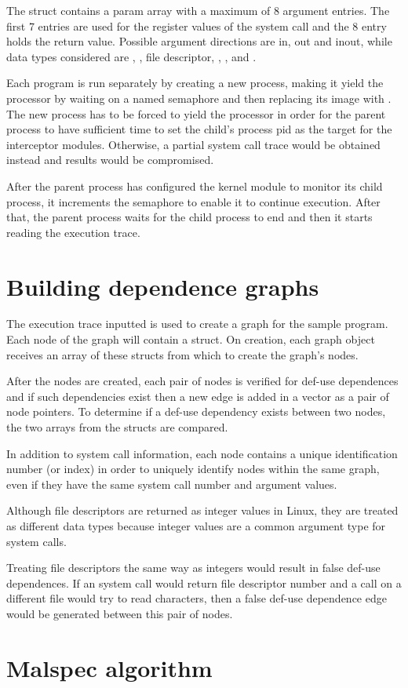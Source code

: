 The  struct contains a param array with a maximum of 8 argument entries. The first 7 entries are used for the register values of the system call and the 8 entry holds the return value.
Possible argument directions are  in, out and inout, while data types considered are , , file descriptor, , ,  and .

Each program is run separately by creating a new process, making it yield the processor by waiting on a named semaphore and then replacing its image with . The new process has to be forced to yield the processor in order for the parent process to have sufficient time to set the child’s process pid as the target for the interceptor modules. Otherwise, a partial system call trace would be obtained instead and results would be compromised. 

After the parent process has configured the kernel module to monitor its child process, it increments the semaphore to enable it to continue execution. After that, the parent process waits for the child process to end and then it starts reading the execution trace.

\section{Building dependence graphs}
\label{fourth:design}

The execution trace inputted is used to create a graph for the sample program. Each node of the graph will contain a  struct. On creation, each graph object receives an array of these structs from which to create the graph’s nodes.

After the nodes are created, each pair of nodes is verified for def-use dependences and if such dependencies exist then a new edge is added in a vector as a pair of node pointers. To determine if a def-use dependency exists between two nodes, the two  arrays from the  structs are compared.

In addition to system call information, each node contains a unique identification number (or index) in order to uniquely identify nodes within the same graph, even if they have the same system call number and argument values.

Although file descriptors are returned as integer values in Linux, they are treated as different data types because integer values are a common argument type for system calls. 

Treating file descriptors the same way as integers would result in false def-use dependences. If an  system call would return file descriptor number  and a  call on a different file would try to read  characters, then a false def-use dependence edge would be generated between this pair of nodes.

\section{Malspec algorithm}
\label{fourth:design}